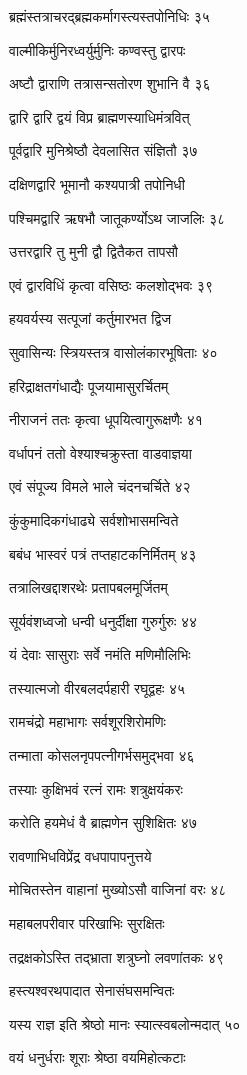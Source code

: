 ब्रह्मंस्तत्राचरद्ब्रह्मकर्मागस्त्यस्तपोनिधिः ३५

वाल्मीकिर्मुनिरध्वर्युर्मुनिः कण्वस्तु द्वारपः

अष्टौ द्वाराणि तत्रासन्सतोरण शुभानि वै ३६

द्वारि द्वारि द्वयं विप्र ब्राह्मणस्याधिमंत्रवित्

पूर्वद्वारि मुनिश्रेष्ठौ देवलासित संज्ञितौ ३७

दक्षिणद्वारि भूमानौ कश्यपात्री तपोनिधी

पश्चिमद्वारि ऋषभौ जातूकर्ण्योऽथ जाजलिः ३८

उत्तरद्वारि तु मुनी द्वौ द्वितैकत तापसौ

एवं द्वारविधिं कृत्वा वसिष्ठः कलशोद्भवः ३९

हयवर्यस्य सत्पूजां कर्तुमारभत द्विज

सुवासिन्यः स्त्रियस्तत्र वासोलंकारभूषिताः ४०

हरिद्राक्षतगंधाद्यैः पूजयामासुरर्चितम्

नीराजनं ततः कृत्वा धूपयित्वागुरूक्षणैः ४१

वर्धापनं ततो वेश्याश्चक्रुस्ता वाडवाज्ञया

एवं संपूज्य विमले भाले चंदनचर्चिते ४२

कुंकुमादिकगंधाढ्ये सर्वशोभासमन्विते

बबंध भास्वरं पत्रं तप्तहाटकनिर्मितम् ४३

तत्रालिखद्दाशरथेः प्रतापबलमूर्जितम्

सूर्यवंशध्वजो धन्वी धनुर्दीक्षा गुरुर्गुरुः ४४

यं देवाः सासुराः सर्वे नमंति मणिमौलिभिः

तस्यात्मजो वीरबलदर्पहारी रघूद्वहः ४५

रामचंद्रो महाभागः सर्वशूरशिरोमणिः

तन्माता कोसलनृपपत्नीगर्भसमुद्भवा ४६

तस्याः कुक्षिभवं रत्नं रामः शत्रुक्षयंकरः

करोति हयमेधं वै ब्राह्मणेन सुशिक्षितः ४७

रावणाभिधविप्रेंद्र वधपापापनुत्तये

मोचितस्तेन वाहानां मुख्योऽसौ वाजिनां वरः ४८

महाबलपरीवार परिखाभिः सुरक्षितः

तद्रक्षकोऽस्ति तद्भ्राता शत्रुघ्नो लवणांतकः ४९

हस्त्यश्वरथपादात सेनासंघसमन्वितः

यस्य राज्ञ इति श्रेष्ठो मानः स्यात्स्वबलोन्मदात् ५०

वयं धनुर्धराः शूराः श्रेष्ठा वयमिहोत्कटाः

